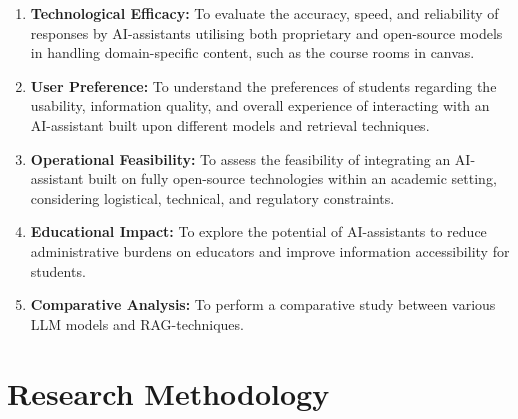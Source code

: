 



\begin{enumerate}
        \item \textbf{Technological Efficacy:} To evaluate the accuracy, speed, and reliability of responses by AI-assistants utilising both proprietary and open-source models in handling domain-specific content, such as the course rooms in canvas.


        \item \textbf{User Preference:} To understand the preferences of students regarding the usability, information quality, and overall experience of interacting with an AI-assistant built upon different models and retrieval techniques.


        \item \textbf{Operational Feasibility:} To assess the feasibility of integrating an AI-assistant built on fully open-source technologies within an academic setting, considering logistical, technical, and regulatory constraints.


        \item \textbf{Educational Impact:} To explore the potential of AI-assistants to reduce administrative burdens on educators and improve information accessibility for students.


        \item \textbf{Comparative Analysis:} To perform a comparative study between various \gls{LLM} models and \gls{RAG}-techniques.
\end{enumerate}






\section{Research Methodology}
\label{sec:research_methodology}


